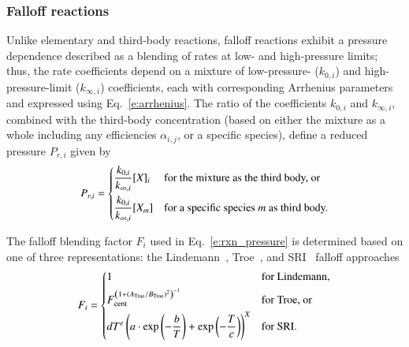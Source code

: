 \documentclass[preprint,12pt]{elsarticle}
\begin{document}
\subsubsection{Falloff reactions}

Unlike elementary and third-body reactions, falloff reactions exhibit a pressure dependence described as a blending of rates at low- and high-pressure limits; thus, the rate coefficients depend on a mixture of low-pressure- ($k_{0, i}$) and high-pressure-limit ($k_{\infty,i}$) coefficients, each with corresponding Arrhenius parameters and expressed using Eq.~\eqref{e:arrhenius}.
The ratio of the coefficients $k_{0, i}$ and $k_{\infty, i}$, combined with the third-body concentration (based on either the mixture as a whole including any efficiencies $\alpha_{i,j}$, or a specific species), define a reduced pressure $P_{r,i}$ given by
\begin{equation}
P_{r,i} = \begin{dcases}
\frac{k_{0,i}}{k_{\infty,i}} [X]_i &\text{for the mixture as the third body, or} \\
\frac{k_{0,i}}{k_{\infty,i}} [X_m] &\text{for a specific species } m \text{ as third body.}
\end{dcases}
\label{e:pr_i}
\end{equation}

The falloff blending factor $F_i$ used in Eq.~\eqref{e:rxn_pressure} is determined based on one of three representations: the Lindemann~\cite{Lindemann:1922cz}, Troe~\cite{Gilbert:1983bb}, and SRI~\cite{Stewart:1989gj} falloff approaches
\begin{equation}
F_i = \begin{dcases}
1 &\text{for Lindemann,} \\
F_{\text{cent}}^{ \left( 1 + ( A_{\text{Troe}} / B_{\text{Troe}} )^2 \right)^{-1} } &\text{for Troe, or} \\
d T^e \left( a \cdot \exp \left( -\frac{b}{T} \right) + \exp \left( -\frac{T}{c} \right) \right)^X &\text{for SRI.}
\end{dcases}
\end{equation}
\end{document}

